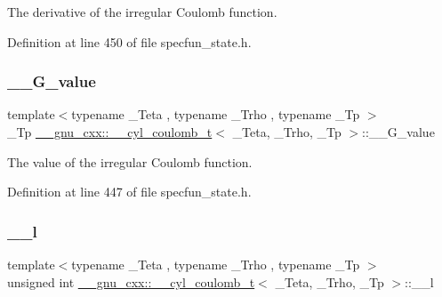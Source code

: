 The derivative of the irregular Coulomb function. 



Definition at line 450 of file specfun\+\_\+state.\+h.

\mbox{\label{struct____gnu__cxx_1_1____cyl__coulomb__t_a918861ff5873097675aa5fc9d5d3a5cd}} 
\subsubsection{\texorpdfstring{\+\_\+\+\_\+\+G\+\_\+value}{\_\_G\_value}}
{\footnotesize\ttfamily template$<$typename \+\_\+\+Teta , typename \+\_\+\+Trho , typename \+\_\+\+Tp $>$ \\
\+\_\+\+Tp \hyperlink{struct____gnu__cxx_1_1____cyl__coulomb__t}{\+\_\+\+\_\+gnu\+\_\+cxx\+::\+\_\+\+\_\+cyl\+\_\+coulomb\+\_\+t}$<$ \+\_\+\+Teta, \+\_\+\+Trho, \+\_\+\+Tp $>$\+::\+\_\+\+\_\+\+G\+\_\+value}



The value of the irregular Coulomb function. 



Definition at line 447 of file specfun\+\_\+state.\+h.

\mbox{\label{struct____gnu__cxx_1_1____cyl__coulomb__t_a402fdb5865c435194f923e50e551799e}} 
\subsubsection{\texorpdfstring{\+\_\+\+\_\+l}{\_\_l}}
{\footnotesize\ttfamily template$<$typename \+\_\+\+Teta , typename \+\_\+\+Trho , typename \+\_\+\+Tp $>$ \\
unsigned int \hyperlink{struct____gnu__cxx_1_1____cyl__coulomb__t}{\+\_\+\+\_\+gnu\+\_\+cxx\+::\+\_\+\+\_\+cyl\+\_\+coulomb\+\_\+t}$<$ \+\_\+\+Teta, \+\_\+\+Trho, \+\_\+\+Tp $>$\+::\+\_\+\+\_\+l}




